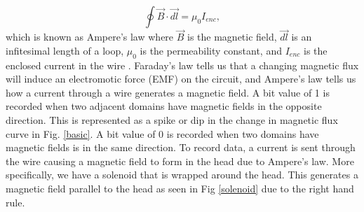 \documentclass[ notitlepage, numerical, 11pt]{revtex4-1} %
\begin{document}
\begin{equation}
\oint \vec{B}\cdot \vec{dl} = \mu_0 I_{enc},
\label{ampere}
\end{equation}
which is known as Ampere's law where $\vec{B}$ is the magnetic field, $\vec{dl}$ is an infitesimal length of a loop, $\mu_0$ is the permeability constant, and $I_{enc}$ is the enclosed current in the wire \cite{purcell}. Faraday's law tells us that a changing magnetic flux will induce an electromotic force (EMF) on the circuit, and Ampere's law tells us how a current through a wire generates a magnetic field. A bit value of 1 is recorded when two adjacent domains have magnetic fields in the opposite direction. This is represented as a spike or dip in the change in magnetic flux curve in Fig. \ref{basic}. A bit value of 0 is recorded when two domains have magnetic fields is in the same direction. To record data, a current is sent through the wire causing a magnetic field to form in the head due to Ampere's law. More specifically, we have a solenoid that is wrapped around the head. This generates a magnetic field parallel to the head as seen in Fig \ref{solenoid} due to the right hand rule. 
\end{document}
